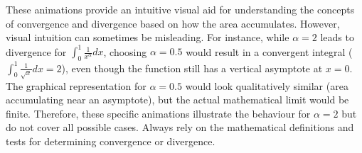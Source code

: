 These animations provide an intuitive visual aid for understanding the concepts of convergence and divergence based on how the area accumulates. However, visual intuition can sometimes be misleading. For instance, while $\alpha=2$ leads to divergence for $\int_0^1 \frac{1}{x^\alpha} dx$, choosing $\alpha=0.5$ would result in a convergent integral ($\int_0^1 \frac{1}{\sqrt{x}} dx = 2$), even though the function still has a vertical asymptote at $x=0$. The graphical representation for $\alpha=0.5$ would look qualitatively similar (area accumulating near an asymptote), but the actual mathematical limit would be finite. Therefore, these specific animations illustrate the behaviour for $\alpha=2$ but do not cover all possible cases. Always rely on the mathematical definitions and tests for determining convergence or divergence.
